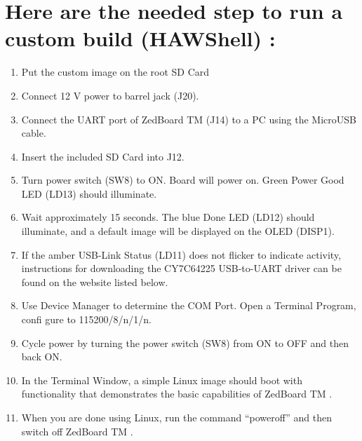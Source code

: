 \documentclass[a4paper, oneside]{scrreprt}
\begin{document}
\section{Here are the needed step to run a custom build (HAWShell) :}
\begin{enumerate}
\item Put the custom image on the root SD Card
\item Connect 12 V power to barrel jack (J20).
\item Connect the UART port of ZedBoard TM (J14) to a PC using the MicroUSB cable.
\item Insert the included SD Card into J12.
\item Turn power switch (SW8) to ON. Board will power on. Green Power Good LED (LD13) should illuminate.
\item Wait approximately 15 seconds. The blue Done LED (LD12) should illuminate, and a default image will be displayed on the OLED (DISP1).
\item If the amber USB-Link Status (LD11) does not flicker to indicate activity, instructions for downloading the CY7C64225 USB-to-UART driver can be found on the website listed below.
\item Use Device Manager to determine the COM Port. Open a Terminal Program, confi gure to 115200/8/n/1/n.
\item Cycle power by turning the power switch (SW8) from ON to OFF and then back ON.
\item In the Terminal Window, a simple Linux image should boot with functionality that demonstrates the basic capabilities of ZedBoard TM .
\item When you are done using Linux, run the command “poweroff” and then switch off ZedBoard TM .
\end{enumerate}
\end{document}
